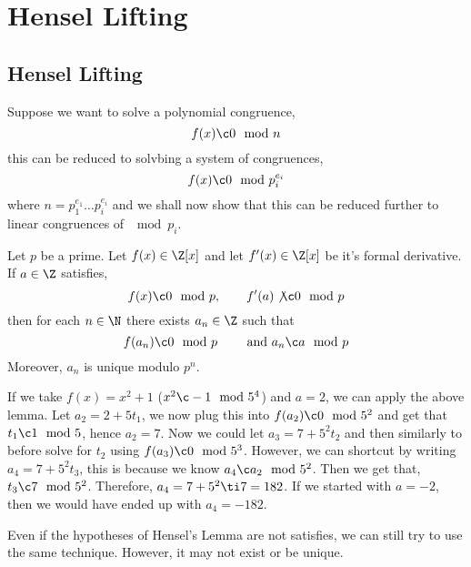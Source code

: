 
\section{Hensel Lifting}
\subsection{Hensel Lifting}
Suppose we want to solve a polynomial congruence,
$$ f(x) \c 0 \mod n $$
this can be reduced to solvbing a system of congruences,
$$ f(x) \c 0 \mod p_i^{e_i} $$
where $n= p_1^{e_1}\dots p_i^{e_i}$ and we shall now show that this can be reduced further to linear congruences of $\mod p_i$.

\begin{nthm}
  Let $p$ be a prime. Let $f(x) \in \Z[x]$ and let $f'(x) \in \Z[x]$ be it's formal derivative. If $a \in \Z$ satisfies,
  $$ f(x) \c 0\mod p, \qquad f'(a) \not\c 0 \mod p $$
  then for each $n \in \N$ there exists $a_n \in \Z$ such that
  $$ f(a_n) \c 0 \mod p \qquad \text{ and } a_n \c a \mod p $$
  Moreover, $a_n$ is unique modulo $p^n$.
\end{nthm}

If we take $f(x) = x^2 + 1$ ($x^2 \c -1 \mod 5^4$) and $a = 2$, we can apply the above lemma. Let $a_2 = 2 + 5t_1$, we now plug this into $f(a_2) \c 0 \mod 5^2$ and get that $t_1 \c 1 \mod 5$, hence $a_2 = 7$. Now we could let $a_3 = 7 + 5^2t_2$ and then similarly to before solve for $t_2$ using
$f(a_3) \c 0 \mod 5^3$. However, we can shortcut by writing $a_4 = 7 + 5^2t_3$, this is because we know $a_4 \c a_2 \mod 5^2$. Then we get that, $t_3 \c 7 \mod 5^2$. Therefore, $a_4 = 7 + 5^2 \ti 7 = 182$. If we started with $a = -2$, then we would have ended up with $a_4 = -182$.

\begin{remark}
  Even if the hypotheses of Hensel's Lemma are not satisfies, we can still try to use the same technique. However, it may not exist or be unique.
\end{remark}

